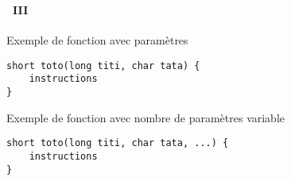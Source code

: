 \begin{frame}[containsverbatim]
  \frametitle{\secname}
  \framesubtitle{\subsecname~III}

  \begin{exampleblock}{Exemple de fonction avec paramètres}
    \begin{verbatim}
short toto(long titi, char tata) {
    instructions
}       
    \end{verbatim}
  \end{exampleblock}

  \begin{exampleblock}{Exemple de fonction avec nombre de paramètres variable}
    \begin{verbatim}
short toto(long titi, char tata, ...) {
    instructions
}       
    \end{verbatim}
  \end{exampleblock}
\end{frame}

